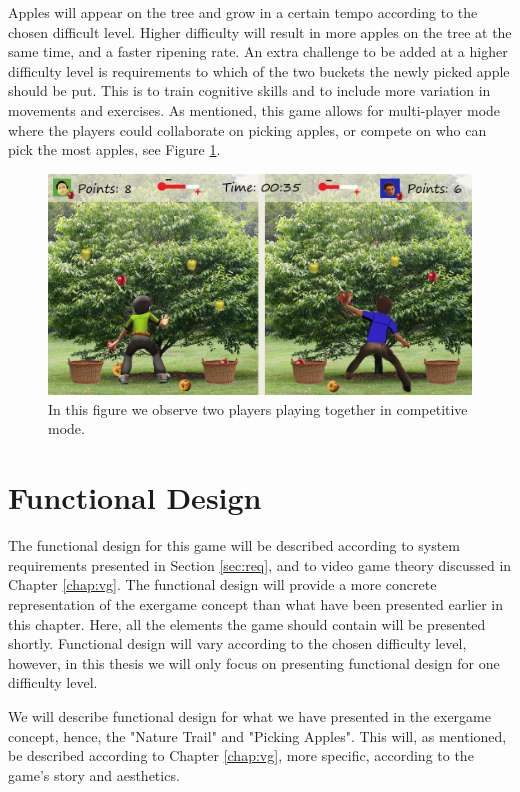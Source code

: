 Apples will appear on the tree and grow in a certain tempo according to the chosen difficult level. Higher difficulty will result in more apples on the tree at the same time, and a faster ripening rate. An extra challenge to be added at a higher difficulty level is requirements to which of the two buckets the newly picked apple should be put. This is to train cognitive skills and to include more variation in movements and exercises. As mentioned, this game allows for multi-player mode where the players could collaborate on picking apples, or compete on who can pick the most apples, see Figure \ref{fig:appleMultiplayer}. 

\begin{figure} [H]
\centering
\includegraphics[scale=0.075]{gameapple2playerEngelsk.jpg}
\caption[Picking apples - multi-player]{In this figure we observe two players playing together in competitive mode.}
\label{fig:appleMultiplayer}
\end{figure}

\section{Functional Design}
\label{sec:functionaldesign}

The functional design for this game will be described according to system requirements presented in Section \ref{sec:req}, and to video game theory discussed in Chapter \ref{chap:vg}. The functional design will provide a more concrete representation of the exergame concept than what have been presented earlier in this chapter. Here, all the elements the game should contain will be presented shortly. Functional design will vary according to the chosen difficulty level, however, in this thesis we will only focus on presenting functional design for one difficulty level.

We will describe functional design for what we have presented in the exergame concept, hence, the "Nature Trail" and "Picking Apples". This will, as mentioned, be described according to Chapter \ref{chap:vg}, more specific, according to the game's story and aesthetics.  

